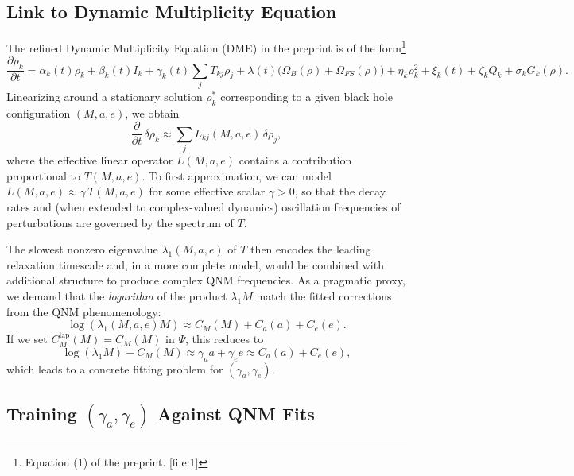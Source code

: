 \documentclass[11pt]{article}
\begin{document}
\subsection{Link to Dynamic Multiplicity Equation}

The refined Dynamic Multiplicity Equation (DME) in the preprint is of the form\footnote{Equation (1) of the preprint. [file:1]}
\begin{equation}
\frac{\partial \rho_k}{\partial t} = \alpha_k(t)\rho_k
+ \beta_k(t) I_k
+ \gamma_k(t)\sum_j T_{kj}\rho_j
+ \lambda(t)\big(\Omega_B(\rho) + \Omega_{FS}(\rho)\big)
+ \eta_k \rho_k^2
+ \xi_k(t)
+ \zeta_k Q_k
+ \sigma_k G_k(\rho).
\label{eq:DME}
\end{equation}
Linearizing around a stationary solution $\rho_k^\ast$ corresponding to a given black hole configuration $(M,a,e)$, we obtain
\begin{equation}
  \frac{\partial}{\partial t}\,\delta \rho_k \approx \sum_j L_{kj}(M,a,e)\,\delta \rho_j,
\end{equation}
where the effective linear operator $L(M,a,e)$ contains a contribution proportional to $T(M,a,e)$. To first approximation, we can model $L(M,a,e) \approx \gamma\,T(M,a,e)$ for some effective scalar $\gamma>0$, so that the decay rates and (when extended to complex-valued dynamics) oscillation frequencies of perturbations are governed by the spectrum of $T$.

The slowest nonzero eigenvalue $\lambda_1(M,a,e)$ of $T$ then encodes the leading relaxation timescale and, in a more complete model, would be combined with additional structure to produce complex QNM frequencies. As a pragmatic proxy, we demand that the \emph{logarithm} of the product $\lambda_1 M$ match the fitted corrections from the QNM phenomenology:
\begin{equation}
  \log(\lambda_1(M,a,e) M) \approx C_M(M) + C_a(a) + C_e(e).
\end{equation}
If we set $C_M^{\text{lap}}(M) = C_M(M)$ in $\Psi$, this reduces to
\begin{equation}
  \log(\lambda_1 M) - C_M(M) \approx \gamma_a a + \gamma_e e \approx C_a(a) + C_e(e),
\end{equation}
which leads to a concrete fitting problem for $(\gamma_a,\gamma_e)$.

\subsection{Training $(\gamma_a,\gamma_e)$ Against QNM Fits}
\end{document}
